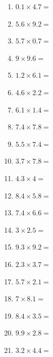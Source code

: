 \documentclass[12pt]{article}
\begin{document}
\begin{enumerate}
\item \large $ 0.1 \times 4.7 = $ \vspace{1.5cm}
\item \large $ 5.6 \times 9.2 = $ \vspace{1.5cm}
\item \large $ 5.7 \times 0.7 = $ \vspace{1.5cm}
\item \large $ 9 \times 9.6 = $ \vspace{1.5cm}
\item \large $ 1.2 \times 6.1 = $ \vspace{1.5cm}
\newpage
\item \large $ 4.6 \times 2.2 = $ \vspace{1.5cm}
\item \large $ 6.1 \times 1.4 = $ \vspace{1.5cm}
\item \large $ 7.4 \times 7.8 = $ \vspace{1.5cm}
\item \large $ 5.5 \times 7.4 = $ \vspace{1.5cm}
\item \large $ 3.7 \times 7.8 = $ \vspace{1.5cm}
\item \large $ 4.3 \times 4 = $ \vspace{1.5cm}
\item \large $ 8.4 \times 5.8 = $ \vspace{1.5cm}
\item \large $ 7.4 \times 6.6 = $ \vspace{1.5cm}
\item \large $ 3 \times 2.5 = $ \vspace{1.5cm}
\item \large $ 9.3 \times 9.2 = $ \vspace{1.5cm}
\newpage
\item \large $ 2.3 \times 3.7 = $ \vspace{1.5cm}
\item \large $ 5.7 \times 2.1 = $ \vspace{1.5cm}
\item \large $ 7 \times 8.1 = $ \vspace{1.5cm}
\item \large $ 8.4 \times 3.5 = $ \vspace{1.5cm}
\item \large $ 9.9 \times 2.8 = $ \vspace{1.5cm}
\item \large $ 3.2 \times 4.4 = $ \vspace{1.5cm}

\end{enumerate}
\end{document}
